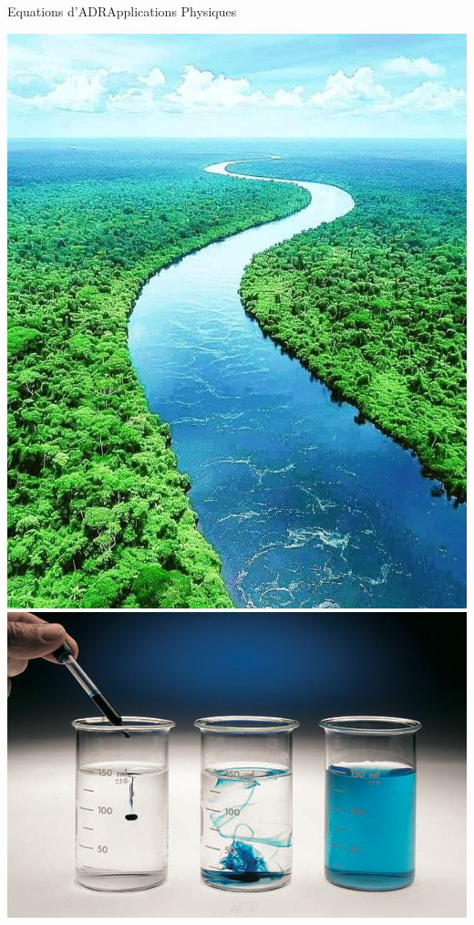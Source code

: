 \begin{frame}{Equations d'ADR}{Applications Physiques}
\begin{center}
    \includegraphics[height=0.4\textheight]{medias/1_/rio_amazonas.png}\hfill
    \includegraphics[height=0.4\textheight]{medias/1_/ink_diffusion.png}\hfill

\end{center}
\end{frame}
